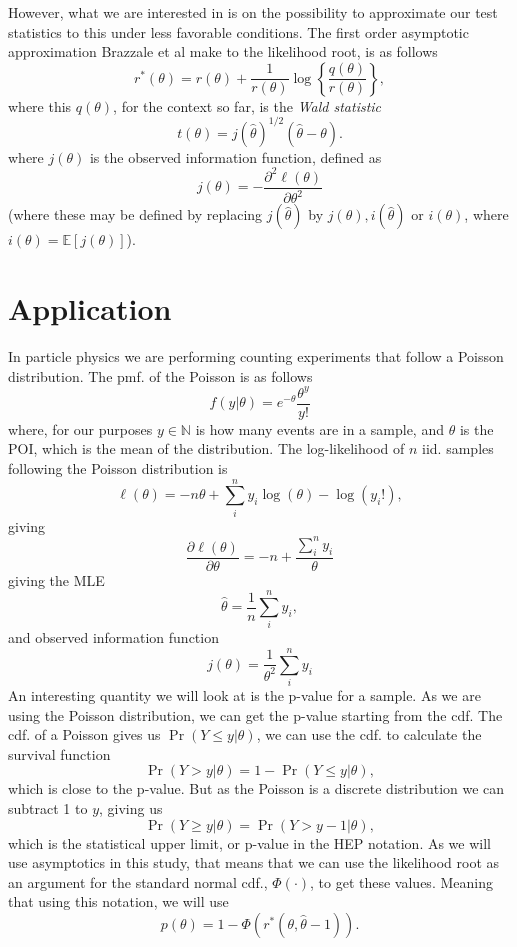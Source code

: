 \documentclass[14pt, a4paper]{article}  %
\begin{document}
However, what we are interested in is on the possibility to approximate our test statistics to this under less favorable conditions. The first order asymptotic approximation Brazzale et al make to the likelihood root, is as follows
\begin{equation}\label{eq:first_approx}
    r^*(\theta)=r(\theta)+\frac{1}{r(\theta)}\log\left\{\frac{q(\theta)}{r(\theta)}\right\},
\end{equation}
where this $q(\theta)$, for the context so far, is the \textit{Wald statistic}
\begin{equation}\label{eq:Wald_stat}
    t(\theta)=j(\hat\theta)^{1/2}(\hat\theta - \theta).
\end{equation}
where $j(\theta)$ is the observed information function, defined as
$$
j(\theta) = -\frac{\partial^2 \ell(\theta)}{\partial\theta^2}
$$
(where these may be defined by replacing $j(\hat\theta)$ by $j(\theta),i(\hat\theta)$ or $ i(\theta)$, where $i(\theta)=\mathbb{E}[j(\theta)]$). 

\section{Application}
In particle physics we are performing counting experiments that follow a Poisson distribution. The pmf. of the Poisson is as follows
\begin{equation}\label{eq:poisson_pmf}
    f(y|\theta) = e^{-\theta}\frac{\theta^y}{y!}
\end{equation}
where, for our purposes $y\in\mathbb{N}$ is how many events are in a sample, and $\theta$ is the POI, which is the mean of the distribution. 
The log-likelihood of $n$ iid. samples following the Poisson distribution is
\begin{equation}\label{eq:poisson_ell}
    \ell(\theta) = -n\theta + \sum_i^n y_i\log(\theta) - \log(y_i!),
\end{equation}
giving
$$ 
\frac{\partial \ell(\theta)}{\partial\theta} = -n + \frac{\sum_i^n y_i}{\theta}
$$
giving the MLE
\begin{equation}\label{eq:poisson_MLE}
    \hat{\theta} = \frac{1}{n}\sum_i^n y_i,
\end{equation}
and observed information function
$$
j(\theta) = \frac{1}{\theta^2}\sum_i^n y_i
$$
An interesting quantity we will look at is the p-value for a sample. As we are using the Poisson distribution, we can get the p-value starting from the cdf. The cdf. of a Poisson gives us $\Pr(Y\leq y|\theta)$, we can use the cdf. to calculate the survival function
$$
\Pr(Y>y|\theta) = 1 - \Pr(Y\leq y|\theta),
$$
which is close to the p-value. But as the Poisson is a discrete distribution we can subtract 1 to $y$, giving us
$$
\Pr(Y\geq y|\theta) = \Pr(Y>y-1|\theta),
$$
which is the statistical upper limit, or p-value in the HEP notation. As we will use asymptotics in this study, that means that we can use the likelihood root as an argument for the standard normal cdf., $\Phi(\cdot)$, to get these values. Meaning that using this notation, we will use
\begin{equation}\label{eq:p-val}
    p(\theta) = 1 - \Phi(r^*(\theta, \hat\theta - 1)).
\end{equation}
\end{document}
